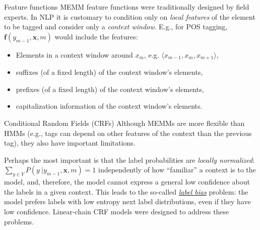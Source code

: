 \documentclass[style=upen, size=14pt]{powerdot}
\theoremstyle{definition}
\begin{document}
  \begin{slide}[toc=Feature functions]{Feature functions}
    MEMM feature functions were traditionally designed by field experts. In NLP
    it is customary to condition only on \emph{local features} of the element to
    be tagged and consider only a \emph{context window}. E.g., for POS tagging,
    $\mathbf{f}(y_{m-1},\mathbf{x}, m)$ would include the features:
    \begin{itemize}
    \item Elements in a context window around $x_m$, e.g.
      $\langle x_{m-1}, x_{m}, x_{m+1} \rangle$,
    \item suffixes (of a fixed length) of the context window's elements,
    \item prefixes (of a fixed length) of the context window's elements,
    \item capitalization information of the context window's elements.
    \end{itemize}
    
    
  \end{slide}

  \begin{slide}[toc=CRFs]{Conditional Random Fields (CRFs)}
    Although MEMMs are more flexible than HMMs (e.g., tags can depend on other
    features of the context than the previous tag), they also have important
    limitations.\bigskip

    Perhaps the most important is that the label probabilities are \emph{locally
      normalized}: $\sum_{y\in Y}P(y~|y_{m-1}, \mathbf{x}, m)=1$ independently
    of how ``familiar'' a context is to the model, and, therefore, the model
    cannot express a general low confidence about the labels in a given context.
    This leads to the so-called \emph{\href{https://awni.github.io/label-bias/}{label bias}} problem: the model prefers
    labels with low entropy next label distributions, even if they have low
    confidence. Linear-chain CRF models were designed to address these problems.
  \end{slide}
\end{document}
